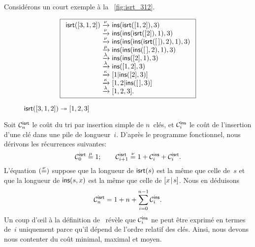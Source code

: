 Considérons un court exemple à la \fig~\vref{fig:isrt_312}.
\begin{figure}
\begin{equation*}
\boxed{%
\begin{array}{r@{\;}l@{\;}l}
\fun{isrt}([3,1,2])
& \xrightarrow{\smash{\nu}} & \fun{ins}(\fun{isrt}([1,2]),3)\\
& \xrightarrow{\smash{\nu}}
& \fun{ins}(\fun{ins}(\fun{isrt}([2]),1),3)\\
& \xrightarrow{\smash{\nu}}
& \fun{ins}(\fun{ins}(\fun{ins}(\fun{isrt}(\el),2),1),3)\\
& \xrightarrow{\smash{\mu}}
& \fun{ins}(\fun{ins}(\fun{ins}(\el,2),1),3)\\
& \xrightarrow{\smash{\lambda}}
& \fun{ins}(\fun{ins}([2],1),3)\\
& \xrightarrow{\smash{\lambda}}
& \fun{ins}([1,2],3)\\
& \xrightarrow{\smash{\kappa}}
& [1|\fun{ins}([2],3)]\\
& \xrightarrow{\smash{\kappa}}
& [1,2|\fun{ins}(\el,3)]\\
& \xrightarrow{\smash{\lambda}}
& [1,2,3].
\end{array}}
\end{equation*}
\caption{\(\fun{isrt}([3,1,2]) \twoheadrightarrow [1,2,3]\)}
\label{fig:isrt_312}
\end{figure}
 

Soit \(\C{\fun{isrt}}{n}\) le coût
du tri par insertion simple de \(n\)~clés, et \(\C{\fun{ins}}{i}\) le
coût de l'insertion d'une clé dans une pile de longueur~\(i\). D'après
le programme fonctionnel, nous dérivons les récurrences suivantes:
\begin{equation*}
\C{\fun{isrt}}{0}   \eqn{\smash{\mu}} 1;\qquad
\C{\fun{isrt}}{i+1} \eqn{\smash{\nu}} 1 + \C{\fun{ins}}{i} +
  \C{\fun{isrt}}{i}.
\end{equation*}
L'équation \((\eqn{\smash{\nu}})\) suppose que la longueur de
\(\fun{isrt}(s)\) est la même que celle de~\(s\) et que la longueur de
\(\fun{ins}(s,x)\) est la même que celle de \(\cons{x}{s}\). Nous en
déduisons
\begin{equation}
\C{\fun{isrt}}{n} = 1 + n + \sum_{i=0}^{n-1}\C{\fun{ins}}{i}.
\label{eq:cost_isrt}
\end{equation}
Un coup d'{\oe}il à la définition de~ révèle que
\(\C{\fun{ins}}{i}\) ne peut être exprimé en termes de~\(i\)
uniquement parce qu'il dépend de l'ordre relatif des clés. Ainsi, nous
devons nous contenter du coût minimal, maximal et
moyen.

